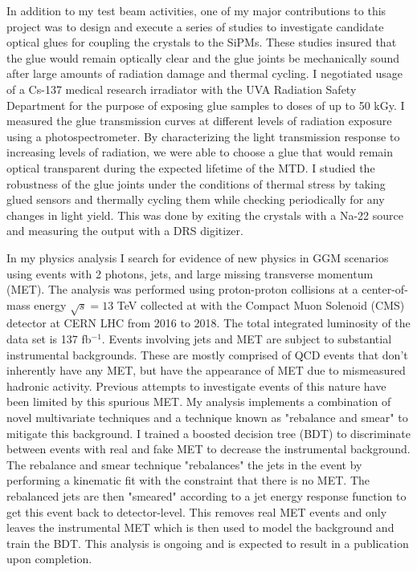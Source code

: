 \documentclass[10pt,a4paper,sans,english]{moderncv}        %
\begin{document}
In addition to my test beam activities, one of my major contributions to this project was to design and execute a series of studies to investigate candidate optical glues for coupling the crystals to the SiPMs.  These studies insured that the glue would remain optically clear and the glue joints be mechanically sound after large amounts of radiation damage and thermal cycling.  I negotiated usage of a Cs-137 medical research irradiator with the UVA Radiation Safety Department for the purpose of exposing glue samples to doses of up to 50 kGy.  I measured the glue transmission curves at different levels of radiation exposure using a photospectrometer.  By characterizing the light transmission response to increasing levels of radiation, we were able to choose a glue that would remain optical transparent during the expected lifetime of the MTD.  I studied the robustness of the glue joints under the conditions of thermal stress by taking glued sensors and thermally cycling them while checking periodically for any changes in light yield.  This was done by exiting the crystals with a Na-22 source and measuring the output with a DRS digitizer.


In my physics analysis I search for evidence of new physics in GGM scenarios using events with 2 photons, jets, and large missing transverse momentum (MET).  The analysis was performed using proton-proton collisions at a center-of-mass energy $\sqrt{s}=13$ TeV collected at with the Compact Muon Solenoid (CMS) detector at CERN LHC from 2016 to 2018.  The total integrated luminosity of the data set is 137 fb$^{-1}$. Events involving jets and MET are subject to substantial instrumental backgrounds.  These are mostly comprised of QCD events that don't inherently have any MET, but have the appearance of MET due to mismeasured hadronic activity.  Previous attempts to investigate events of this nature have been limited by this spurious MET. My analysis implements a combination of novel multivariate techniques and a technique known as "rebalance and smear" to mitigate this background.  I trained a boosted decision tree (BDT) to discriminate between events with real and fake MET to decrease the instrumental background.  The rebalance and smear technique "rebalances" the jets in the event by performing a kinematic fit with the constraint that there is no MET.  The rebalanced jets are then "smeared" according to a jet energy response function to get this event back to detector-level.  This removes real MET events and only leaves the instrumental MET which is then used to model the background and train the BDT. This analysis is ongoing and is expected to result in a publication upon completion.
\end{document}
